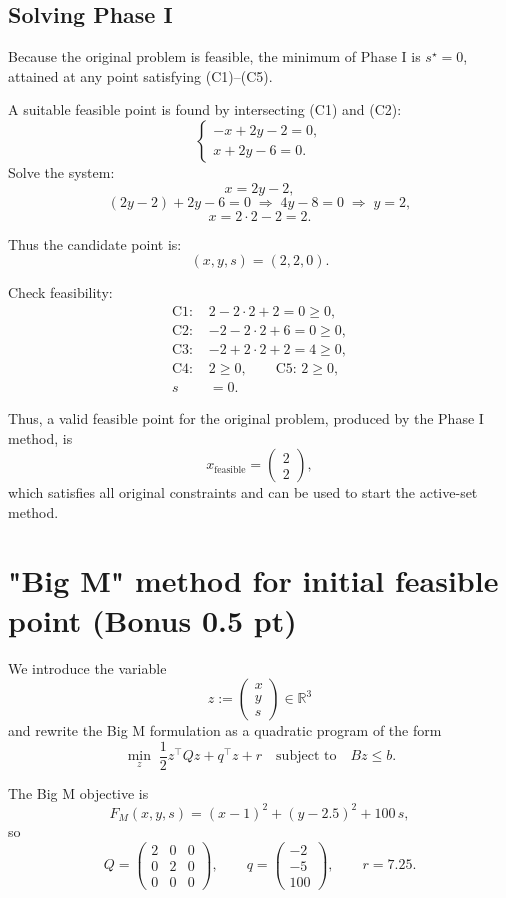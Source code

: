 \documentclass[11pt]{article}
\begin{document}
\subsection*{Solving Phase I}

Because the original problem is feasible, the minimum of Phase I is \(s^\star = 0\), attained at any point satisfying (C1)–(C5).

A suitable feasible point is found by intersecting (C1) and (C2):
\[
\begin{cases}
-x + 2y - 2 = 0,\\
x + 2y - 6 = 0.
\end{cases}
\]
Solve the system:
\[
x = 2y - 2,
\]
\[
(2y - 2) + 2y - 6 = 0
\;\Rightarrow\; 4y - 8 = 0
\;\Rightarrow\; y = 2,
\]
\[
x = 2\cdot 2 - 2 = 2.
\]

Thus the candidate point is:
\[
(x,y,s) = (2,2,0).
\]

Check feasibility:
\[
\begin{aligned}
\text{C1: } &2 - 2\cdot 2 + 2 = 0 \ge 0,\\
\text{C2: } &-2 - 2\cdot 2 + 6 = 0 \ge 0,\\
\text{C3: } &-2 + 2\cdot 2 + 2 = 4 \ge 0,\\
\text{C4: } &2 \ge 0,\qquad
\text{C5: } 2 \ge 0,\\
s &= 0.
\end{aligned}
\]

Thus, a valid feasible point for the original problem, produced by the Phase I method, is
\[
x_{\text{feasible}} = \begin{pmatrix}2\\[0.2em]2\end{pmatrix},
\]
which satisfies all original constraints and can be used to start the active-set method.

\section*{"Big M" method for initial feasible point (Bonus 0.5 pt)}

We introduce the variable
\[
z := \begin{pmatrix}x\\y\\s\end{pmatrix} \in \mathbb{R}^3
\]
and rewrite the Big M formulation as a quadratic program of the form
\[
\min_{z} \; \frac12 z^\top Q z + q^\top z + r
\quad\text{subject to}\quad
Bz \le b.
\]

The Big M objective is
\[
F_M(x,y,s) = (x-1)^2 + (y-2.5)^2 + 100\,s,
\]
so
\[
Q = \begin{pmatrix}
2 & 0 & 0\\
0 & 2 & 0\\
0 & 0 & 0
\end{pmatrix},\qquad
q = \begin{pmatrix}-2\\-5\\100\end{pmatrix},\qquad
r = 7.25.
\]
\end{document}
